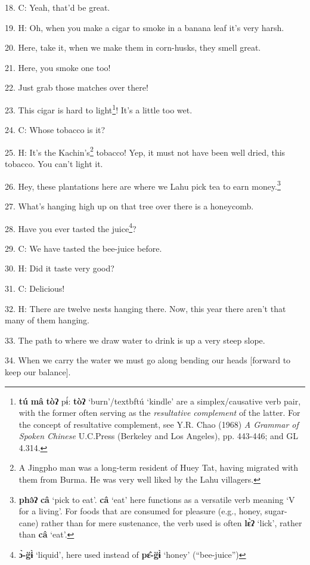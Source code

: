 18. C: Yeah, that'd be great.

19. H: Oh, when you make a cigar to smoke in a banana leaf it's very harsh.

20. Here, take it, when we make them in corn-husks, they smell great.

21. Here, you smoke one too!

22. Just grab those matches over there!

23. This cigar is hard to light\footnote{\textbf{tú} \textbf{mâ} \textbf{tòʔ} pɨ́:\textit{\textbf{ }}\textbf{tòʔ} `burn'/textbf{tú} `kindle' are a simplex/causative verb pair, with the former often serving as the \textit{resultative complement }of the latter. For the concept of resultative complement, see Y.R. Chao (1968) \textit{A Grammar of Spoken Chinese }U.C.Press (Berkeley and Los Angeles), pp. 443-446; and GL 4.314.}! It's a little too wet.

24. C: Whose tobacco is it?

25. H: It's the Kachin's\footnote{A Jingpho man was a long-term resident of Huey Tat, having migrated with them from Burma. He was very well liked by the Lahu villagers.} tobacco! Yep, it must not have been well dried, this
tobacco. You can't light it.

26. Hey, these plantations here are where we Lahu pick tea to earn money.\footnote{\textbf{phə̂ʔ} \textbf{câ} `pick to eat'. \textbf{câ} `eat' here functions as a versatile verb meaning `V for a living'. For foods that are consumed for pleasure (e.g., honey, sugar-cane) rather than for mere sustenance, the verb used is often \textbf{lɛ̀ʔ} `lick', rather than \textbf{câ} `eat'.}

27. What's hanging high up on that tree over there is a honeycomb.

28. Have you ever tasted the juice\footnote{\textbf{ɔ̀-g̈ɨ̀} `liquid', here used instead of \textbf{pɛ̂-g̈ɨ̀} `honey' (``bee-juice'')}?

29. C: We have tasted the bee-juice before.

30. H: Did it taste very good?

31. C: Delicious!

32. H: There are twelve nests hanging there. Now, this year there aren't that many
of them hanging.

33. The path to where we draw water to drink is up a very steep slope.

34. When we carry the water we must go along bending our heads [forward to keep
our balance].

